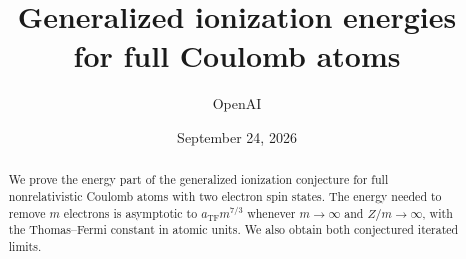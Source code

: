 \documentclass[11pt]{article}
\title{Generalized ionization energies\\for full Coulomb atoms}
\author{OpenAI}
\date{September 24, 2026}
\numberwithin{equation}{section}
\theoremstyle{definition}
\newcommand{\TF}{\mathrm{TF}}
\begin{document}
\maketitle
\begin{abstract}
We prove the energy part of the generalized ionization conjecture for full
nonrelativistic Coulomb atoms with two electron spin states. The energy needed
to remove $m$ electrons is asymptotic to $a_{\TF}m^{7/3}$ whenever $m\to\infty$
and $Z/m\to\infty$, with the Thomas--Fermi constant in atomic units.
We also obtain both conjectured iterated limits.
\end{abstract}
\begingroup
\small
\tableofcontents
\endgroup






\begingroup
\small
\raggedright
{}
{}


\endgroup
\end{document}
